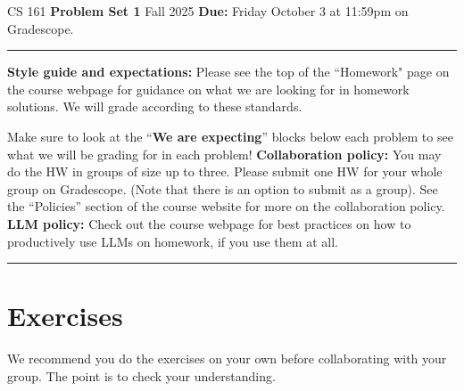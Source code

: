 \documentclass[11pt]{article}
\begin{document}
\noindent
CS 161 \hfill \textbf{Problem Set 1} \newline 
{Fall 2025} \hfill \textbf{Due:} Friday October 3 at 11:59pm on Gradescope.

\noindent
\rule{\linewidth}{0.4pt}

\noindent
\textbf{Style guide and expectations:} Please see the top of the ``Homework" page on the course webpage for guidance on what we are looking for in homework solutions.  We will grade according to these standards.

Make sure to look at the ``\textbf{We are expecting}'' blocks below each problem to see what we will be grading for in each problem!
\newline\newline
\textbf{Collaboration policy:} You may do the HW in groups of size up to three.  Please submit one HW for your whole group on Gradescope.  (Note that there is an option to submit as a group).  See the ``Policies'' section of the course website for more on the collaboration policy.
\noindent
\newline\newline
\textbf{LLM policy:} Check out the course webpage for best practices on how to productively use LLMs on homework, if you use them at all.   \newline\noindent
\rule{\linewidth}{0.4pt}

\section*{Exercises}
We recommend you do the exercises on your own before collaborating with your group.  The point is to check your understanding.
\end{document}
